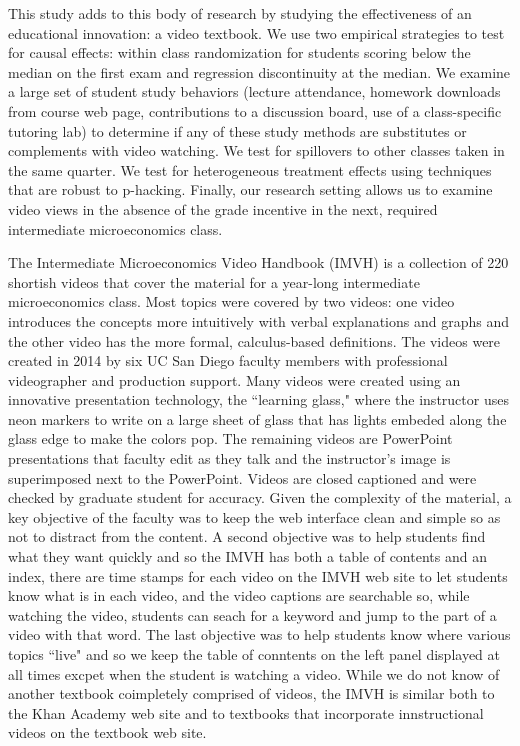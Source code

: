 \documentclass[12pt]{article}
\begin{document}
This study adds to this body of research by studying the effectiveness of an educational innovation: a video textbook. We use two empirical strategies to test for causal effects: within class randomization for students scoring below the median on the first exam and regression discontinuity at the median. We examine a large set of student study behaviors (lecture attendance, homework downloads from course web page, contributions to a discussion board, use of a class-specific tutoring lab) to determine if any of these study methods are substitutes or complements with video watching. We test for spillovers to other classes taken in the same quarter. We test for heterogeneous treatment effects using techniques that are robust to p-hacking. Finally, our research setting allows us to examine video views in the absence of the grade incentive in the next, required intermediate microeconomics class.


The Intermediate Microeconomics Video Handbook (IMVH) is a collection of 220 shortish videos that cover the material for a year-long intermediate microeconomics class. Most topics were covered by two videos: one video introduces the concepts more intuitively with verbal explanations and graphs and the other video has the more formal, calculus-based definitions. The videos were created in 2014 by six UC San Diego faculty members with professional videographer and production support. Many videos were created using an innovative presentation technology, the ``learning glass," where the instructor uses neon markers to write on a large sheet of glass that has lights embeded along the glass edge to make the colors pop. The remaining videos are PowerPoint presentations that faculty edit as they talk and the instructor's image is superimposed next to the PowerPoint. Videos are closed captioned and were checked by graduate student for accuracy. Given the complexity of the material, a key objective of the faculty was to keep the web interface clean and simple so as not to distract from the content. A second objective was to help students find what they want quickly and so the IMVH has both a table of contents and an index, there are time stamps for each video on the IMVH web site to let students know what is in each video, and the video captions are searchable so, while watching the video, students can seach for a keyword and jump to the part of a video with that word. The last objective was to help students know where various topics ``live" and so we keep the table of conntents on the left panel displayed at all times excpet when the student is watching a video. While we do not know of another textbook coimpletely comprised of videos, the IMVH is similar both to the Khan Academy web site and to textbooks that incorporate innstructional videos on the textbook web site.
\end{document}
